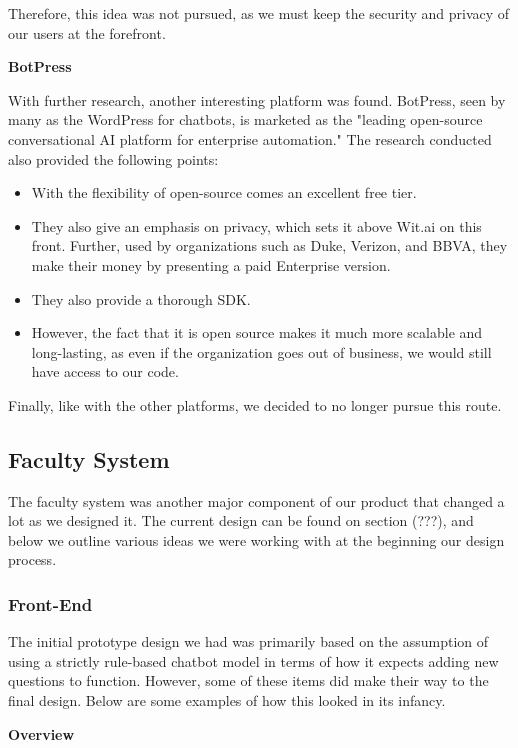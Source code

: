 \documentclass[titlepage, 12pt]{article}
\begin{document}
Therefore, this idea was not pursued, as we must keep the security and privacy of our users at the forefront.

\textbf{BotPress}

With further research, another interesting platform was found. BotPress, seen by many as the WordPress for chatbots, is marketed as the "leading open-source conversational AI platform for enterprise automation." The research conducted also provided the following points:

\begin{itemize}
    \item With the flexibility of open-source comes an excellent free tier.
    \item They also give an emphasis on privacy, which sets it above Wit.ai on this front. Further, used by organizations such as Duke, Verizon, and BBVA, they make their money by presenting a paid Enterprise version.
    \item They also provide a thorough SDK.
    \item However, the fact that it is open source makes it much more scalable and long-lasting, as even if the organization goes out of business, we would still have access to our code.
\end{itemize}

Finally, like with the other platforms, we decided to no longer pursue this route.

\subsection{Faculty System}

The faculty system was another major component of our product that changed a lot as we designed it. The current design can be found on section (???), and below we outline various ideas we were working with at the beginning our design process.

\subsubsection{Front-End}

The initial prototype design we had was primarily based on the assumption of using a strictly rule-based chatbot model in terms of how it expects adding new questions to function. However, some of these items did make their way to the final design. Below are some examples of how this looked in its infancy.

\textbf{Overview}
\end{document}
